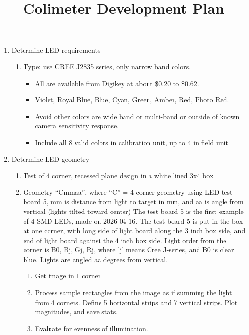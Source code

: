 \documentclass{article}
\title{Colimeter Development Plan}
\author{}
\date{}
\begin{document}
\maketitle

\begin{enumerate}[label=\arabic*.]

\item Determine LED requirements
\begin{enumerate}[label=\alph*)]
    \item Type: use CREE J2835 series, only narrow band colors.
    \begin{itemize}
        \item All are available from Digikey at about \$0.20 to \$0.62.
        \item Violet, Royal Blue, Blue, Cyan, Green, Amber, Red, Photo Red.
        \item Avoid other colors are wide band or multi-band or outside of known camera sensitivity response.
        \item Include all 8 valid colors in calibration unit, up to 4 in field unit
    \end{itemize}
\end{enumerate}

\item Determine LED geometry
\begin{enumerate}[label=\alph*)]
    \item Test of 4 corner, recessed plane design in a white lined 3x4 box
    \item Geometry ``Cmmaa'', where    
       ``C'' = 4 corner geometry using LED test board 5,
       mm is distance from light to target in mm, and
       aa is angle from vertical (lights tilted toward center)
       The test board 5 is the first example of 4 SMD LEDs, made on 2026-04-16. 
       The test board 5 is put in the box at one corner, with long side of light board along the 3 inch box side, and end  of light board against the 4 inch box side.
       Light order from the corner is B0, Bj, Gj, Rj, where 'j' means Cree J-series, and B0 is clear blue. 
       Lights are angled aa degrees from vertical. 
    \begin{enumerate}[label=\roman*)]
        \item Get image in 1 corner
        \item Process sample rectangles from the image as if summing the light from 4 corners.
        Define 5 horizontal strips and 7 vertical strips. Plot magnitudes, and save stats.
        \item Evaluate for evenness of illumination.
    \end{enumerate}
\end{enumerate}


\end{enumerate}
\end{document}
